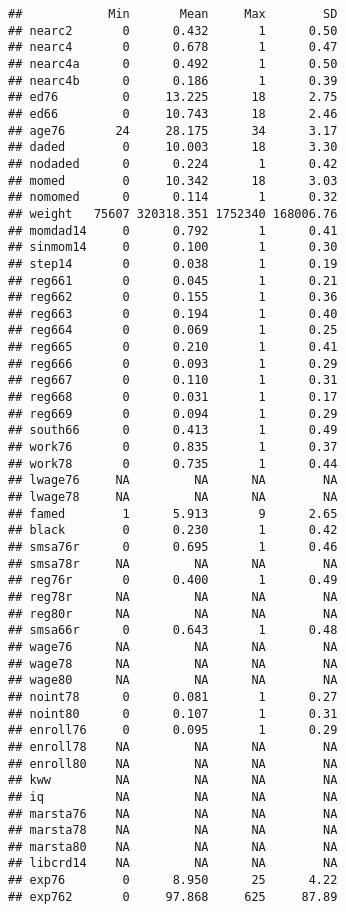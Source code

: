 \documentclass[
]{article}
\begin{document}
\begin{verbatim}
##            Min       Mean     Max        SD
## nearc2       0      0.432       1      0.50
## nearc4       0      0.678       1      0.47
## nearc4a      0      0.492       1      0.50
## nearc4b      0      0.186       1      0.39
## ed76         0     13.225      18      2.75
## ed66         0     10.743      18      2.46
## age76       24     28.175      34      3.17
## daded        0     10.003      18      3.30
## nodaded      0      0.224       1      0.42
## momed        0     10.342      18      3.03
## nomomed      0      0.114       1      0.32
## weight   75607 320318.351 1752340 168006.76
## momdad14     0      0.792       1      0.41
## sinmom14     0      0.100       1      0.30
## step14       0      0.038       1      0.19
## reg661       0      0.045       1      0.21
## reg662       0      0.155       1      0.36
## reg663       0      0.194       1      0.40
## reg664       0      0.069       1      0.25
## reg665       0      0.210       1      0.41
## reg666       0      0.093       1      0.29
## reg667       0      0.110       1      0.31
## reg668       0      0.031       1      0.17
## reg669       0      0.094       1      0.29
## south66      0      0.413       1      0.49
## work76       0      0.835       1      0.37
## work78       0      0.735       1      0.44
## lwage76     NA         NA      NA        NA
## lwage78     NA         NA      NA        NA
## famed        1      5.913       9      2.65
## black        0      0.230       1      0.42
## smsa76r      0      0.695       1      0.46
## smsa78r     NA         NA      NA        NA
## reg76r       0      0.400       1      0.49
## reg78r      NA         NA      NA        NA
## reg80r      NA         NA      NA        NA
## smsa66r      0      0.643       1      0.48
## wage76      NA         NA      NA        NA
## wage78      NA         NA      NA        NA
## wage80      NA         NA      NA        NA
## noint78      0      0.081       1      0.27
## noint80      0      0.107       1      0.31
## enroll76     0      0.095       1      0.29
## enroll78    NA         NA      NA        NA
## enroll80    NA         NA      NA        NA
## kww         NA         NA      NA        NA
## iq          NA         NA      NA        NA
## marsta76    NA         NA      NA        NA
## marsta78    NA         NA      NA        NA
## marsta80    NA         NA      NA        NA
## libcrd14    NA         NA      NA        NA
## exp76        0      8.950      25      4.22
## exp762       0     97.868     625     87.89
\end{verbatim}
\end{document}
